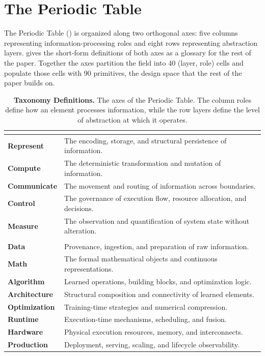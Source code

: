 \documentclass[10pt,twocolumn]{article}
\newcommand{\tablebody}{\footnotesize}
\begin{document}
\section{The Periodic Table}
\label{sec:taxonomy}

The Periodic Table () is organized along two orthogonal axes: five columns representing information-processing roles and eight rows representing abstraction layers.  gives the short-form definitions of both axes as a glossary for the rest of the paper. Together the axes partition the field into 40 (layer, role) cells and populate those cells with 90 primitives, the design space that the rest of the paper builds on.

\begin{table}[ht]
\tablebody
\centering
\caption{\textbf{Taxonomy Definitions.} The axes of the Periodic Table. The column roles define how an element processes information, while the row layers define the level of abstraction at which it operates.}
\label{tab:definitions}
\begin{tabularx}{\columnwidth}{@{} >{\bfseries}l X @{}}
\toprule
\multicolumn{2}{@{}l}{\textbf{Information-Processing Roles (Columns)}} \\
\midrule
Represent   & The encoding, storage, and structural persistence of information. \\
Compute     & The deterministic transformation and mutation of information. \\
Communicate & The movement and routing of information across boundaries. \\
Control     & The governance of execution flow, resource allocation, and decisions. \\
Measure     & The observation and quantification of system state without alteration. \\
\midrule
\multicolumn{2}{@{}l}{\textbf{Abstraction Layers (Rows)}} \\
\midrule
Data         & Provenance, ingestion, and preparation of raw information. \\
Math         & The formal mathematical objects and continuous representations. \\
Algorithm    & Learned operations, building blocks, and optimization logic. \\
Architecture & Structural composition and connectivity of learned elements. \\
Optimization & Training-time strategies and numerical compression. \\
Runtime      & Execution-time mechanisms, scheduling, and fusion. \\
Hardware     & Physical execution resources, memory, and interconnects. \\
Production   & Deployment, serving, scaling, and lifecycle observability. \\
\bottomrule
\end{tabularx}
\end{table}
\end{document}
